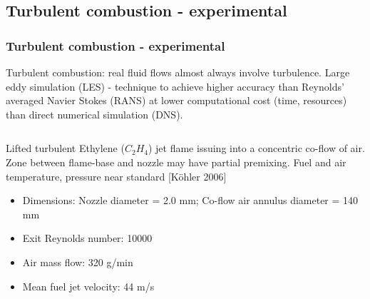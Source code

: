 \documentclass{beamer}
\begin{document}
\subsection{Turbulent combustion - experimental}
\begin{frame}%
\frametitle{Turbulent combustion - experimental}
\small{Turbulent combustion: real fluid flows almost always involve turbulence. Large eddy simulation (LES) - technique to achieve higher accuracy than Reynolds' averaged Navier Stokes (RANS) at lower computational cost (time, resources) than direct numerical simulation (DNS).}
\begin{minipage}[0.5\textheight]{\textwidth}
\begin{columns}[T]
\begin{column}{0.65\textwidth}
\vspace{20pt}
\small{Lifted turbulent Ethylene ($C_2H_4$) jet flame issuing into a concentric co-flow of air. Zone between flame-base and nozzle may have partial premixing. Fuel and air temperature, pressure near standard [K{\"o}hler 2006] \cite{Kohler}}
\begin{itemize}%
\tiny
\setlength\itemsep{-0.7mm}
\item Dimensions: Nozzle diameter = 2.0 mm; Co-flow air annulus diameter = 140 mm\\
\item Exit Reynolds number: 10000
\item Air mass flow: 320 g/min 
\item Mean fuel jet velocity: 44 m/s 
\end{itemize}
\end{column}


\end{columns}
\end{minipage}
\end{frame}
\end{document}

